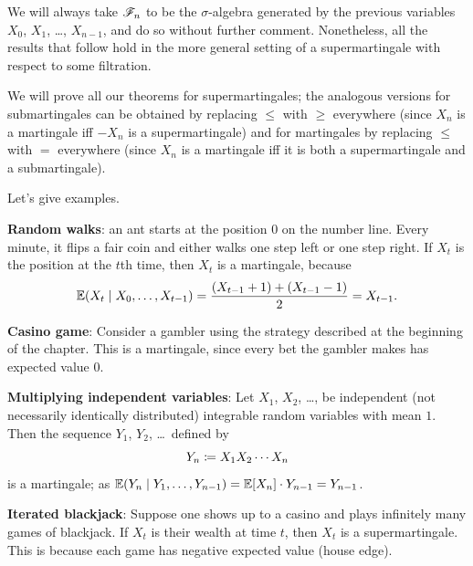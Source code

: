
\begin{abuse}
	We will always take $\mathscr F_n$ to be the $\sigma$-algebra
	generated by the previous variables $X_0$, $X_1$, \dots, $X_{n-1}$,
	and do so without further comment.
	Nonetheless, all the results that follow hold in the more general setting
	of a supermartingale with respect to some filtration.
\end{abuse}

We will prove all our theorems for supermartingales;
the analogous versions for submartingales can be obtained
by replacing $\le$ with $\ge$ everywhere
(since $X_n$ is a martingale iff $-X_n$ is a supermartingale)
and for martingales by replacing $\le$ with $=$ everywhere
(since $X_n$ is a martingale iff it is both a supermartingale
and a submartingale).

Let's give examples.
\begin{example}
	[Supermartingales]
	\label{ex:supermartingales}
	\listhack
	\begin{enumerate}[(a)]
		\ii \textbf{Random walks}:
		an ant starts at the position $0$ on the number line.
		Every minute, it flips a fair coin and either
		walks one step left or one step right.
		If $X_t$ is the position at the $t$th time,
		then $X_t$ is a martingale, because
		\[ \mathbb E(X_t \mid X_0, \dots, X_{t-1})
			= \frac{(X_{t-1}+1) + (X_{t-1}-1)}{2} = X_{t-1}. \]

		\ii \textbf{Casino game}:
		Consider a gambler using the strategy described
		at the beginning of the chapter.
		This is a martingale, since every bet the gambler makes
		has expected value $0$.

		\ii \textbf{Multiplying independent variables}:
		Let $X_1$, $X_2$, \dots, be independent (not necessarily
		identically distributed) integrable random variables with mean $1$.
		Then the sequence $Y_1$, $Y_2$, \dots\ defined by
		\[ Y_n \coloneqq X_1 X_2 \cdots X_n \]
		is a martingale; as
		$\mathbb E(Y_n \mid Y_1, \dots, Y_{n-1}) = \mathbb E[X_n] \cdot Y_{n-1} = Y_{n-1}$.

		\ii \textbf{Iterated blackjack}:
		Suppose one shows up to a casino and plays
		infinitely many games of blackjack.
		If $X_t$ is their wealth at time $t$, then $X_t$ is a supermartingale.
		This is because each game has negative expected value (house edge).
	\end{enumerate}
\end{example}

